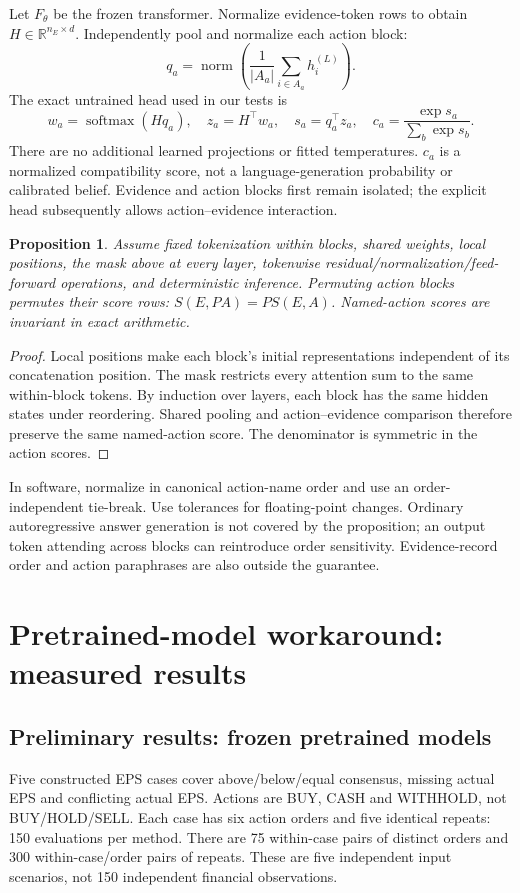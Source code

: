 \documentclass[11pt]{article}
\newtheorem{proposition}{Proposition}
\begin{document}
Let $F_\theta$ be the frozen transformer. Normalize evidence-token rows to obtain $H\in\mathbb R^{n_E\times d}$. Independently pool and normalize each action block:
\begin{equation}
q_a=\operatorname{norm}\left(\frac{1}{|A_a|}\sum_{i\in A_a}h_i^{(L)}\right).
\end{equation}
The exact untrained head used in our tests is
\begin{equation}
w_a=\operatorname{softmax}(Hq_a),\quad z_a=H^\top w_a,\quad
s_a=q_a^\top z_a,\quad c_a=\frac{\exp s_a}{\sum_b\exp s_b}.
\end{equation}
There are no additional learned projections or fitted temperatures. $c_a$ is a normalized compatibility score, not a language-generation probability or calibrated belief. Evidence and action blocks first remain isolated; the explicit head subsequently allows action--evidence interaction.

\begin{proposition}
Assume fixed tokenization within blocks, shared weights, local positions, the mask above at every layer, tokenwise residual/normalization/feed-forward operations, and deterministic inference. Permuting action blocks permutes their score rows: $S(E,PA)=PS(E,A)$. Named-action scores are invariant in exact arithmetic.
\end{proposition}
\begin{proof}
Local positions make each block's initial representations independent of its concatenation position. The mask restricts every attention sum to the same within-block tokens. By induction over layers, each block has the same hidden states under reordering. Shared pooling and action--evidence comparison therefore preserve the same named-action score. The denominator is symmetric in the action scores.
\end{proof}
In software, normalize in canonical action-name order and use an order-independent tie-break. Use tolerances for floating-point changes. Ordinary autoregressive answer generation is not covered by the proposition; an output token attending across blocks can reintroduce order sensitivity. Evidence-record order and action paraphrases are also outside the guarantee.
\newpage
\section{Pretrained-model workaround: measured results}
\subsection*{Preliminary results: frozen pretrained models}
Five constructed EPS cases cover above/below/equal consensus, missing actual EPS and conflicting actual EPS. Actions are BUY, CASH and WITHHOLD, not BUY/HOLD/SELL. Each case has six action orders and five identical repeats: 150 evaluations per method. There are 75 within-case pairs of distinct orders and 300 within-case/order pairs of repeats. These are five independent input scenarios, not 150 independent financial observations.
\end{document}
